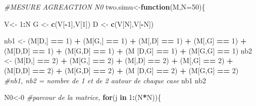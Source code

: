 \documentclass[
]{article}
\newenvironment{Shaded}{\begin{snugshade}}{\end{snugshade}}
\newcommand{\CommentTok}[1]{\textcolor[rgb]{0.56,0.35,0.01}{\textit{#1}}}
\newcommand{\ControlFlowTok}[1]{\textcolor[rgb]{0.13,0.29,0.53}{\textbf{#1}}}
\newcommand{\DataTypeTok}[1]{\textcolor[rgb]{0.13,0.29,0.53}{#1}}
\newcommand{\DecValTok}[1]{\textcolor[rgb]{0.00,0.00,0.81}{#1}}
\newcommand{\KeywordTok}[1]{\textcolor[rgb]{0.13,0.29,0.53}{\textbf{#1}}}
\newcommand{\NormalTok}[1]{#1}
\newcommand{\OperatorTok}[1]{\textcolor[rgb]{0.81,0.36,0.00}{\textbf{#1}}}
\newcommand{\StringTok}[1]{\textcolor[rgb]{0.31,0.60,0.02}{#1}}
\begin{document}
\begin{Shaded}
\begin{Highlighting}[]
\CommentTok{#MESURE AGREAGTION N0}
\NormalTok{two.simu<-}\ControlFlowTok{function}\NormalTok{(M,}\DataTypeTok{N=}\DecValTok{50}\NormalTok{)\{}
 
\NormalTok{V<-}\StringTok{ }\DecValTok{1}\OperatorTok{:}\NormalTok{N}
\NormalTok{G <-}\StringTok{ }\KeywordTok{c}\NormalTok{(V[}\OperatorTok{-}\DecValTok{1}\NormalTok{],V[}\DecValTok{1}\NormalTok{])}
\NormalTok{D <-}\StringTok{ }\KeywordTok{c}\NormalTok{(V[N],V[}\OperatorTok{-}\NormalTok{N])}
  
  
\NormalTok{nb1 <-}\StringTok{ }\NormalTok{(M[D,] }\OperatorTok{==}\StringTok{ }\DecValTok{1}\NormalTok{) }\OperatorTok{+}\StringTok{ }\NormalTok{(M[G,] }\OperatorTok{==}\StringTok{ }\DecValTok{1}\NormalTok{) }\OperatorTok{+}\StringTok{ }\NormalTok{(M[,D] }\OperatorTok{==}\StringTok{ }\DecValTok{1}\NormalTok{) }\OperatorTok{+}\StringTok{ }\NormalTok{(M[,G] }\OperatorTok{==}\StringTok{ }\DecValTok{1}\NormalTok{) }\OperatorTok{+}\StringTok{ }\NormalTok{(M[D,D] }\OperatorTok{==}\StringTok{ }\DecValTok{1}\NormalTok{) }\OperatorTok{+}\StringTok{ }\NormalTok{(M[G,D] }\OperatorTok{==}\StringTok{ }\DecValTok{1}\NormalTok{) }\OperatorTok{+}\StringTok{ }\NormalTok{(M [D,G] }\OperatorTok{==}\StringTok{ }\DecValTok{1}\NormalTok{) }\OperatorTok{+}\StringTok{ }\NormalTok{(M[G,G] }\OperatorTok{==}\StringTok{ }\DecValTok{1}\NormalTok{)}
\NormalTok{nb2 <-}\StringTok{ }\NormalTok{(M[D,] }\OperatorTok{==}\StringTok{ }\DecValTok{2}\NormalTok{) }\OperatorTok{+}\StringTok{ }\NormalTok{(M[G,] }\OperatorTok{==}\StringTok{ }\DecValTok{2}\NormalTok{) }\OperatorTok{+}\StringTok{ }\NormalTok{(M[,D] }\OperatorTok{==}\StringTok{ }\DecValTok{2}\NormalTok{) }\OperatorTok{+}\StringTok{ }\NormalTok{(M[,G] }\OperatorTok{==}\StringTok{ }\DecValTok{2}\NormalTok{) }\OperatorTok{+}\StringTok{ }\NormalTok{(M[D,D] }\OperatorTok{==}\StringTok{ }\DecValTok{2}\NormalTok{) }\OperatorTok{+}\StringTok{ }\NormalTok{(M[G,D] }\OperatorTok{==}\StringTok{ }\DecValTok{2}\NormalTok{) }\OperatorTok{+}\StringTok{ }\NormalTok{(M [D,G] }\OperatorTok{==}\StringTok{ }\DecValTok{2}\NormalTok{) }\OperatorTok{+}\StringTok{ }\NormalTok{(M[G,G] }\OperatorTok{==}\StringTok{ }\DecValTok{2}\NormalTok{)}
\CommentTok{#nb1, nb2 = nombre de 1 et de 2 autour de chaque case}
\NormalTok{nb1}
\NormalTok{nb2}


\NormalTok{N0<-}\DecValTok{0}
\CommentTok{#parcour de la matrice, }
\ControlFlowTok{for}\NormalTok{(j }\ControlFlowTok{in} \DecValTok{1}\OperatorTok{:}\NormalTok{(N}\OperatorTok{*}\NormalTok{N))\{}
  

\end{Highlighting}
\end{Shaded}
\end{document}
